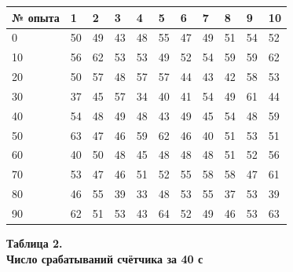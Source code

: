 \begin{table}[H]
    \centering
    \begin{tabular}{|l|l|l|l|l|l|l|l|l|l|l|}
        \hline
        № опыта & 1  & 2  & 3  & 4  & 5  & 6  & 7  & 8  & 9  & 10 \\ \hline
        0       & 50 & 49 & 43 & 48 & 55 & 47 & 49 & 51 & 54 & 52 \\ \hline
        10      & 56 & 62 & 53 & 53 & 49 & 52 & 54 & 59 & 59 & 62 \\ \hline
        20      & 50 & 57 & 48 & 57 & 57 & 44 & 43 & 42 & 58 & 53 \\ \hline
        30      & 37 & 45 & 57 & 34 & 40 & 41 & 54 & 49 & 61 & 44 \\ \hline
        40      & 54 & 48 & 49 & 48 & 43 & 49 & 45 & 54 & 48 & 59 \\ \hline
        50      & 63 & 47 & 46 & 59 & 62 & 46 & 40 & 51 & 53 & 51 \\ \hline
        60      & 40 & 50 & 48 & 45 & 48 & 48 & 48 & 51 & 52 & 56 \\ \hline
        70      & 53 & 47 & 46 & 51 & 52 & 55 & 58 & 58 & 47 & 61 \\ \hline
        80      & 46 & 55 & 39 & 33 & 48 & 53 & 55 & 37 & 53 & 39 \\ \hline
        90      & 62 & 51 & 53 & 43 & 64 & 52 & 49 & 46 & 53 & 63 \\ \hline
    \end{tabular}
    \begin{flushright}
        {\scriptsize \textbf{Таблица 2.}\\ \textbf {Число срабатываний счётчика за 40 с}}
    \end{flushright}
\end{table}


